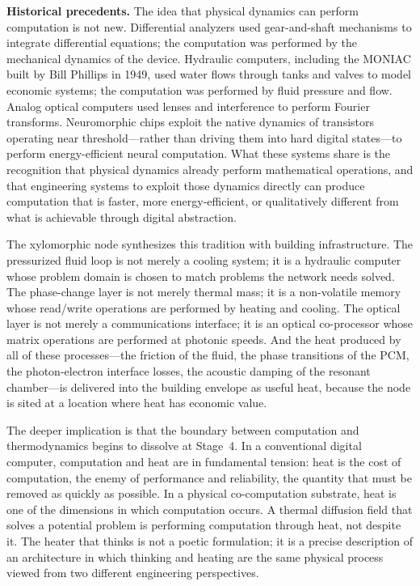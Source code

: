 \documentclass[12pt, oneside]{article}
\begin{document}
\textbf{Historical precedents.} The idea that physical dynamics can perform computation is not new. Differential analyzers used gear-and-shaft mechanisms to integrate differential equations; the computation was performed by the mechanical dynamics of the device. Hydraulic computers, including the MONIAC built by Bill Phillips in 1949, used water flows through tanks and valves to model economic systems; the computation was performed by fluid pressure and flow. Analog optical computers used lenses and interference to perform Fourier transforms. Neuromorphic chips exploit the native dynamics of transistors operating near threshold---rather than driving them into hard digital states---to perform energy-efficient neural computation. What these systems share is the recognition that physical dynamics already perform mathematical operations, and that engineering systems to exploit those dynamics directly can produce computation that is faster, more energy-efficient, or qualitatively different from what is achievable through digital abstraction.

The xylomorphic node synthesizes this tradition with building infrastructure. The pressurized fluid loop is not merely a cooling system; it is a hydraulic computer whose problem domain is chosen to match problems the network needs solved. The phase-change layer is not merely thermal mass; it is a non-volatile memory whose read/write operations are performed by heating and cooling. The optical layer is not merely a communications interface; it is an optical co-processor whose matrix operations are performed at photonic speeds. And the heat produced by all of these processes---the friction of the fluid, the phase transitions of the PCM, the photon-electron interface losses, the acoustic damping of the resonant chamber---is delivered into the building envelope as useful heat, because the node is sited at a location where heat has economic value.

The deeper implication is that the boundary between computation and thermodynamics begins to dissolve at Stage~4. In a conventional digital computer, computation and heat are in fundamental tension: heat is the cost of computation, the enemy of performance and reliability, the quantity that must be removed as quickly as possible. In a physical co-computation substrate, heat is one of the dimensions in which computation occurs. A thermal diffusion field that solves a potential problem is performing computation through heat, not despite it. The heater that thinks is not a poetic formulation; it is a precise description of an architecture in which thinking and heating are the same physical process viewed from two different engineering perspectives.
\end{document}
